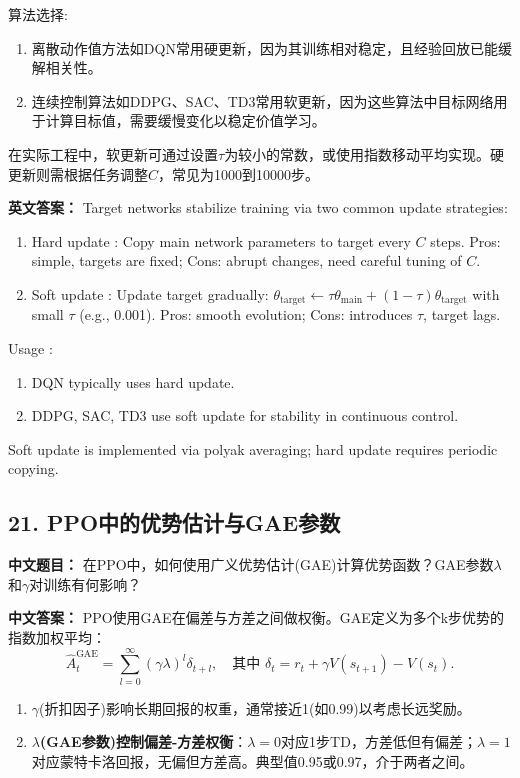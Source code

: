 \documentclass[10pt,a4paper]{ctexart}
\begin{document}
 算法选择:
\begin{enumerate}
    \item 离散动作值方法如DQN常用硬更新，因为其训练相对稳定，且经验回放已能缓解相关性。
    \item 连续控制算法如DDPG、SAC、TD3常用软更新，因为这些算法中目标网络用于计算目标值，需要缓慢变化以稳定价值学习。
\end{enumerate}

在实际工程中，软更新可通过设置\(\tau\)为较小的常数，或使用指数移动平均实现。硬更新则需根据任务调整\(C\)，常见为1000到10000步。

\textbf{英文答案：}  
Target networks stabilize training via two common update strategies:

\begin{enumerate}
    \item Hard update : Copy main network parameters to target every \(C\) steps. Pros: simple, targets are fixed; Cons: abrupt changes, need careful tuning of \(C\).
    \item Soft update : Update target gradually: \(\theta_{\text{target}} \leftarrow \tau \theta_{\text{main}} + (1-\tau) \theta_{\text{target}}\) with small \(\tau\) (e.g., 0.001). Pros: smooth evolution; Cons: introduces \(\tau\), target lags.
\end{enumerate}

 Usage :
\begin{enumerate}
    \item DQN typically uses hard update.
    \item DDPG, SAC, TD3 use soft update for stability in continuous control.
\end{enumerate}

Soft update is implemented via polyak averaging; hard update requires periodic copying.

\subsection*{21. PPO中的优势估计与GAE参数}
\textbf{中文题目：} 在PPO中，如何使用广义优势估计(GAE)计算优势函数？GAE参数\(\lambda\)和\(\gamma\)对训练有何影响？

\textbf{中文答案：}  
PPO使用GAE在偏差与方差之间做权衡。GAE定义为多个k步优势的指数加权平均：
\[
\hat{A}_t^{\text{GAE}} = \sum_{l=0}^{\infty} (\gamma\lambda)^l \delta_{t+l}, \quad \text{其中 } \delta_t = r_t + \gamma V(s_{t+1}) - V(s_t).
\]  
\begin{enumerate}
    \item \(\gamma\)(折扣因子)影响长期回报的权重，通常接近1(如0.99)以考虑长远奖励。
    \item \textbf{\(\lambda\)(GAE参数)控制偏差-方差权衡}：\(\lambda=0\)对应1步TD，方差低但有偏差；\(\lambda=1\)对应蒙特卡洛回报，无偏但方差高。典型值0.95或0.97，介于两者之间。
\end{enumerate}
\end{document}
